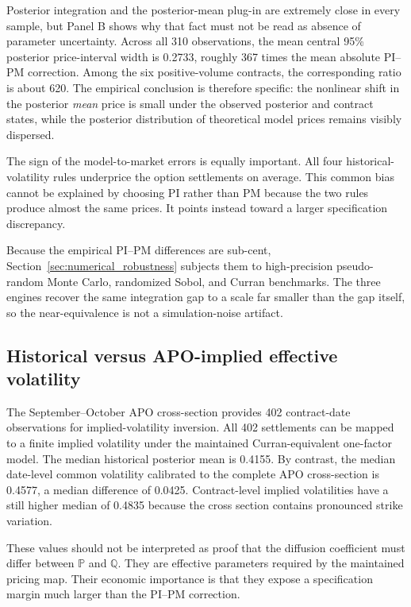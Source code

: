 Posterior integration and the posterior-mean plug-in are extremely close in every sample, but Panel B shows why that fact must not be read as absence of parameter uncertainty. Across all 310 observations, the mean central 95\% posterior price-interval width is 0.2733, roughly 367 times the mean absolute PI--PM correction. Among the six positive-volume contracts, the corresponding ratio is about 620. The empirical conclusion is therefore specific: the nonlinear shift in the posterior \emph{mean} price is small under the observed posterior and contract states, while the posterior distribution of theoretical model prices remains visibly dispersed.

The sign of the model-to-market errors is equally important. All four historical-volatility rules underprice the option settlements on average. This common bias cannot be explained by choosing PI rather than PM because the two rules produce almost the same prices. It points instead toward a larger specification discrepancy.

Because the empirical PI--PM differences are sub-cent, Section~\ref{sec:numerical_robustness} subjects them to high-precision pseudo-random Monte Carlo, randomized Sobol, and Curran benchmarks. The three engines recover the same integration gap to a scale far smaller than the gap itself, so the near-equivalence is not a simulation-noise artifact.

\subsection{Historical versus APO-implied effective volatility}

The September--October APO cross-section provides 402 contract-date observations for implied-volatility inversion. All 402 settlements can be mapped to a finite implied volatility under the maintained Curran-equivalent one-factor model. The median historical posterior mean is 0.4155. By contrast, the median date-level common volatility calibrated to the complete APO cross-section is 0.4577, a median difference of 0.0425. Contract-level implied volatilities have a still higher median of 0.4835 because the cross section contains pronounced strike variation.

These values should not be interpreted as proof that the diffusion coefficient must differ between $\mathbb P$ and $\mathbb Q$. They are effective parameters required by the maintained pricing map. Their economic importance is that they expose a specification margin much larger than the PI--PM correction.

